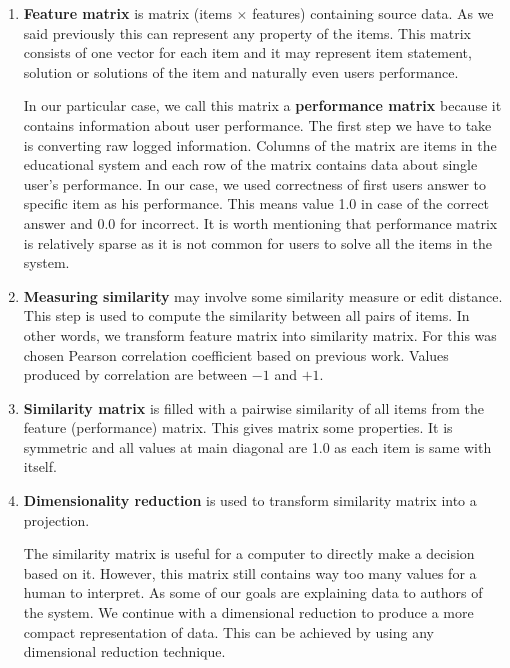 \documentclass[
  digital, %
  table,   %
  nolof,     %
  nolot,     %
  nocover,
  color,
  final, %
]{fithesis3}
\begin{document}
\begin{enumerate}
  \item
    \textbf{Feature matrix} is matrix (items $\times$ features) containing source data. As we said previously this can represent any property of the items. This matrix consists of one vector for each item and it may represent item statement, solution or solutions of the item and naturally even users performance.

    In our particular case, we call this matrix a \textbf{performance matrix} because it contains information about user performance. The first step we have to take is converting raw logged information. Columns of the matrix are items in the educational system and each row of the matrix contains data about single user's performance. In our case, we used correctness of first users answer to specific item as his performance. This means value 1.0 in case of the correct answer and 0.0 for incorrect. It is worth mentioning that performance matrix is relatively sparse as it is not common for users to solve all the items in the system.

  \item
    \textbf{Measuring similarity} may involve some similarity measure or edit distance. This step is used to compute the similarity between all pairs of items. In other words, we transform feature matrix into similarity matrix. For this was chosen Pearson correlation coefficient based on previous work. Values produced by correlation are between $-1$ and $+1$.

  \item
    \textbf{Similarity matrix} is filled with a pairwise similarity of all items from the feature (performance) matrix. This gives matrix some properties. It is symmetric and all values at main diagonal are 1.0 as each item is same with itself.

  \item
    \textbf{Dimensionality reduction} is used to transform similarity matrix into a projection.


    The similarity matrix is useful for a computer to directly make a decision based on it. However, this matrix still contains way too many values for a human to interpret. As some of our goals are explaining data to authors of the system. We continue with a dimensional reduction to produce a more compact representation of data. This can be achieved by using any dimensional reduction technique.


\end{enumerate}
\end{document}
